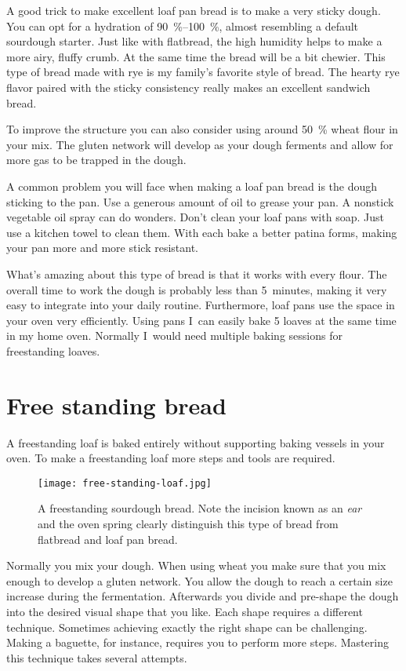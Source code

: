 A good trick to make excellent loaf pan bread is to make a very
sticky dough. You can opt for a hydration of \qtyrange{90}{100}{\percent}, almost
resembling a default sourdough starter. Just like with flatbread,
the high humidity helps to make a more airy, fluffy crumb. At
the same time the bread will be a bit chewier. This
type of bread made with rye is my family's favorite style of bread.
The hearty rye flavor paired with the sticky consistency really
makes an excellent sandwich bread.

To improve the structure you can also consider using around \qty{50}{\percent}
wheat flour in your mix. The gluten network will develop as your
dough ferments and allow for more gas to be trapped in the dough.

A common problem you will face when making a loaf pan bread is
the dough sticking to the pan. Use a generous amount of oil to grease
your pan. A nonstick vegetable oil spray can do wonders.
Don't clean your loaf pans with soap. Just use a kitchen towel
to clean them. With each bake a better patina forms, making your
pan more and more stick resistant.

What's amazing about this type of bread is that it works
with every flour. The overall time to work the dough is probably
less than 5~minutes, making it very easy to integrate
into your daily routine. Furthermore, loaf pans use the space
in your oven very efficiently. Using pans I~can
easily bake 5 loaves at the same time in my home oven.
Normally I~would need multiple baking sessions for
freestanding loaves.

\section{Free standing bread}

A freestanding loaf is baked entirely without supporting
baking vessels in your oven. To make a freestanding loaf more steps
and tools are required.

\begin{figure}[!htb]
\begin{center}
  \texttt{[image: free-standing-loaf.jpg]}
  \caption{A freestanding sourdough bread. Note the incision known as an
      \emph{ear} and the oven spring clearly
  distinguish this type of bread from flatbread and loaf pan bread.}
\end{center}
\end{figure}

Normally you mix your dough. When using wheat you make sure
that you mix enough to develop a gluten network.
You allow the dough to reach
a certain size increase during the fermentation. Afterwards you divide and pre-shape
the dough into the desired visual shape that you like.
Each shape requires a different technique. Sometimes achieving
exactly the right shape can be challenging. Making a baguette,
for instance, requires you to perform more steps. Mastering this
technique takes several attempts.

